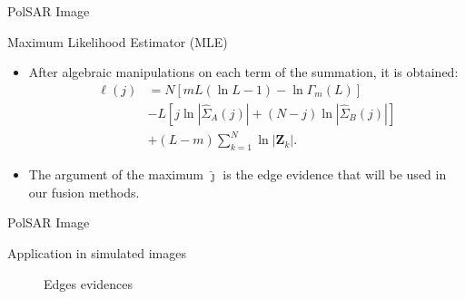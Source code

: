 \documentclass[10pt]{beamer}
\begin{document}
\begin{frame}[fragile]{PolSAR Image}
\begin{alertblock}{Maximum Likelihood Estimator (MLE)}
\begin{itemize}
	\item After algebraic manipulations on each term of the summation, it is obtained:
\begin{align}\nonumber
	\ell(j)&=N\left[mL(\ln{L}-1)-\ln{\Gamma_m(L)}\right]\\\nonumber
	&- L\left[j\ln{|\widehat{\Sigma}_{A}(j)|} +(N-j)\ln{|\widehat{\Sigma}_{B}(j)|}\right] \\
	&+ (L-m)\sum_{k=1}^{N}\ln{|\mathbf{Z}_{k}|}.\label{eq_09}
\end{align}

\item The argument of the maximum $\widehat{\jmath}$ is the edge evidence that will be used in our fusion methods.
\end{itemize}
\end{alertblock}
\end{frame}

\begin{frame}[fragile]{PolSAR Image}
\begin{alertblock}{Application in simulated images}
	\begin{figure}[hbt]
    \caption{Edges evidences}
     \label{fig_Edges-Evidence}
\end{figure}
\end{alertblock}
\end{frame}
\end{document}
